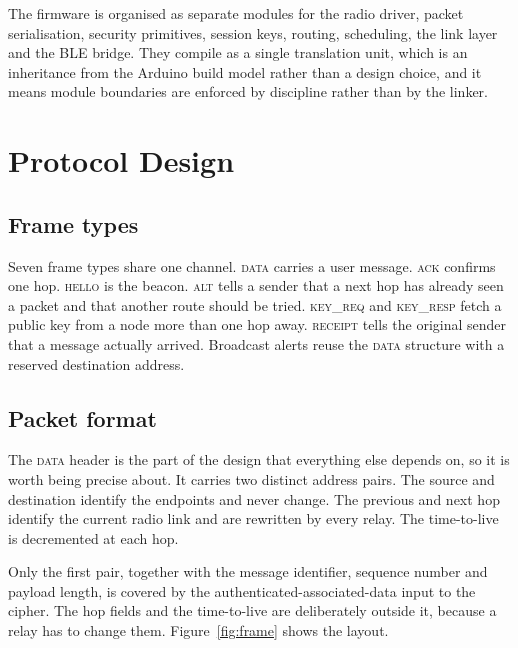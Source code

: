 \documentclass[conference]{IEEEtran}
\begin{document}
The firmware is organised as separate modules for the radio driver, packet
serialisation, security primitives, session keys, routing, scheduling, the link
layer and the BLE bridge. They compile as a single translation unit, which is an
inheritance from the Arduino build model rather than a design choice, and it
means module boundaries are enforced by discipline rather than by the linker.

\section{Protocol Design}\label{sec:protocol}

\subsection{Frame types}

Seven frame types share one channel. \textsc{data} carries a user message.
\textsc{ack} confirms one hop. \textsc{hello} is the beacon. \textsc{alt} tells a
sender that a next hop has already seen a packet and that another route should be
tried. \textsc{key\_req} and \textsc{key\_resp} fetch a public key from a node
more than one hop away. \textsc{receipt} tells the original sender that a message
actually arrived. Broadcast alerts reuse the \textsc{data} structure with a
reserved destination address.

\subsection{Packet format}

The \textsc{data} header is the part of the design that everything else depends
on, so it is worth being precise about. It carries two distinct address pairs.
The source and destination identify the endpoints and never change. The previous
and next hop identify the current radio link and are rewritten by every relay.
The time-to-live is decremented at each hop.

Only the first pair, together with the message identifier, sequence number and
payload length, is covered by the authenticated-associated-data input to the
cipher. The hop fields and the time-to-live are deliberately outside it, because
a relay has to change them. Figure~\ref{fig:frame} shows the layout.
\end{document}
